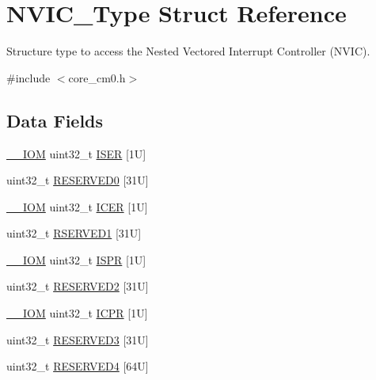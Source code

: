 \hypertarget{struct_n_v_i_c___type}{}\section{N\+V\+I\+C\+\_\+\+Type Struct Reference}
\label{struct_n_v_i_c___type}


Structure type to access the Nested Vectored Interrupt Controller (N\+V\+IC).  




{\ttfamily \#include $<$core\+\_\+cm0.\+h$>$}

\subsection*{Data Fields}
\begin{DoxyCompactItemize}
\item 
\hyperlink{core__sc300_8h_ab6caba5853a60a17e8e04499b52bf691}{\+\_\+\+\_\+\+I\+OM} uint32\+\_\+t \hyperlink{struct_n_v_i_c___type_a1f970af55366c7caaf51407309f304db}{I\+S\+ER} \mbox{[}1\+U\mbox{]}
\item 
uint32\+\_\+t \hyperlink{struct_n_v_i_c___type_a99ed1d1bbc9e85b465fb29f40f37aa3a}{R\+E\+S\+E\+R\+V\+E\+D0} \mbox{[}31\+U\mbox{]}
\item 
\hyperlink{core__sc300_8h_ab6caba5853a60a17e8e04499b52bf691}{\+\_\+\+\_\+\+I\+OM} uint32\+\_\+t \hyperlink{struct_n_v_i_c___type_a3617ee583e4154c0a5901c6965020da9}{I\+C\+ER} \mbox{[}1\+U\mbox{]}
\item 
uint32\+\_\+t \hyperlink{struct_n_v_i_c___type_aea9a4f17e5fa16fa35ba48cc9f27434b}{R\+S\+E\+R\+V\+E\+D1} \mbox{[}31\+U\mbox{]}
\item 
\hyperlink{core__sc300_8h_ab6caba5853a60a17e8e04499b52bf691}{\+\_\+\+\_\+\+I\+OM} uint32\+\_\+t \hyperlink{struct_n_v_i_c___type_aecb96022a2971ea637c06798bd131e91}{I\+S\+PR} \mbox{[}1\+U\mbox{]}
\item 
uint32\+\_\+t \hyperlink{struct_n_v_i_c___type_ad31fe99d09ec7629b716f06af05d0a54}{R\+E\+S\+E\+R\+V\+E\+D2} \mbox{[}31\+U\mbox{]}
\item 
\hyperlink{core__sc300_8h_ab6caba5853a60a17e8e04499b52bf691}{\+\_\+\+\_\+\+I\+OM} uint32\+\_\+t \hyperlink{struct_n_v_i_c___type_a4d45961e44d2663447bbf0111755c0e7}{I\+C\+PR} \mbox{[}1\+U\mbox{]}
\item 
uint32\+\_\+t \hyperlink{struct_n_v_i_c___type_a97d3441cfdde21959e8acbbdc358b99f}{R\+E\+S\+E\+R\+V\+E\+D3} \mbox{[}31\+U\mbox{]}
\item 
uint32\+\_\+t \hyperlink{struct_n_v_i_c___type_aba051916995cac44d084f98e03710def}{R\+E\+S\+E\+R\+V\+E\+D4} \mbox{[}64\+U\mbox{]}

\end{DoxyCompactItemize}
